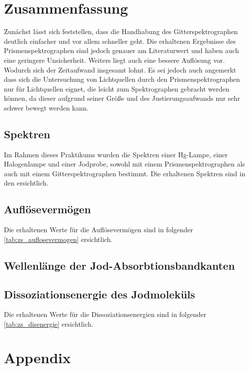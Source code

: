 \documentclass[12pt,english,ngerman]{scrartcl}
\begin{document}
\section{Zusammenfassung}\label{sec:zs}
Zunächst lässt sich feststellen, dass die Handhabung des Gitterspektrographen
deutlich einfacher und vor allem schneller geht. Die erhaltenen Ergebnisse des
Prismenspektrographen sind jedoch genauer am Literaturwert und haben auch eine
geringere Unsicherheit. Weiters liegt auch eine bessere Auflösung vor. Wodurch
sich der Zeitaufwand insgesamt lohnt. Es sei jedoch auch angemerkt dass sich
die Untersuchung von Lichtquellen durch den Prismenspektrographen nur für
Lichtquellen eignet, die leicht zum Spektrographen gebracht werden können, da
dieser aufgrund seiner Größe und des Justierungsaufwands nur sehr schwer bewegt
werden kann.

\subsection{Spektren}

Im Rahmen dieses Praktikums wurden die Spektren einer Hg-Lampe, einer
Halogenlampe und einer Jodprobe, sowohl mit einem Prismenspektrographen als
auch mit einem Gitterspektrographen bestimmt. Die erhaltenen Spektren sind in
den 
ersichtlich.

\subsection{Auflösevermögen}

Die erhaltenen Werte für die Auflösevermögen sind in folgender
\autoref{tab:zs_auflosevermogen} ersichtlich.

\subsection{Wellenlänge der Jod-Absorbtionsbandkanten}


\subsection{Dissoziationsenergie des Jodmoleküls}

Die erhaltenen Werte für die Dissoziationsenergien sind in folgender
\autoref{tab:zs_disenergie} ersichtlich.

\newpage

\section{Appendix}\label{sec:Appendix}
\end{document}
